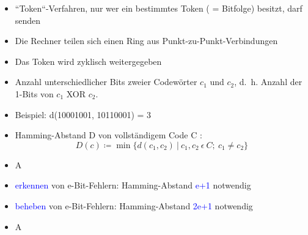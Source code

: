 \begin{itemize}
    \item “Token“-Verfahren, nur wer ein bestimmtes Token ( = Bitfolge) besitzt, darf senden
    \item Die Rechner teilen sich einen Ring aus Punkt-zu-Punkt-Verbindungen
    \item Das Token wird zyklisch weitergegeben
\end{itemize}

\begin{itemize}
    \item Anzahl unterschiedlicher Bits zweier Codewörter $c_1$ und $c_2$, d.\ h. Anzahl der 1-Bits von $c_1$ XOR $c_2$.
    \item Beispiel: d(10001001, 10110001) = 3
    \item Hamming-Abstand D von vollständigem Code C : \[ D(c)\coloneqq \min\{d(c_1 ,c_2)\ |\ c_1 ,c_2\ \epsilon \ C; \ c_1 \neq c_2\}\]
\end{itemize}

\begin{itemize}
    \item \todo A
\end{itemize}

\begin{itemize}
    \item \textcolor{blue}{erkennen} von e-Bit-Fehlern: Hamming-Abstand \textcolor{blue}{e+1} notwendig
    \item \textcolor{blue}{beheben} von e-Bit-Fehlern: Hamming-Abstand \textcolor{blue}{2e+1} notwendig
\end{itemize}

\begin{itemize}
    \item \todo A
\end{itemize}

